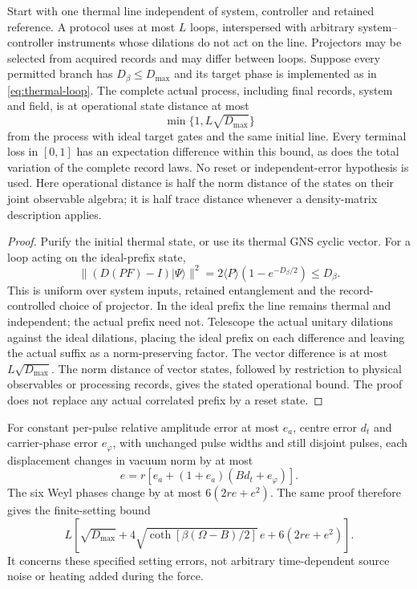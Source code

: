 \begin{proposition}
\label{prop:thermal-reuse}
Start with one thermal line independent of system, controller and retained
reference. A protocol uses at most $L$ loops, interspersed with arbitrary
system--controller instruments whose dilations do not act on the line.
Projectors may be selected from acquired records and may differ between
loops. Suppose every permitted branch has $D_\beta\le D_{\max}$
and its target phase is implemented as in \eqref{eq:thermal-loop}.
The complete actual process, including final records, system and field,
is at operational state distance at most
\[
 \min\{1,L\sqrt{D_{\max}}\}
\]
from the process with ideal target gates and the same initial line.
Every terminal loss in $[0,1]$ has an expectation difference within
this bound, as does the total variation of the complete record laws.
No reset or independent-error hypothesis is used.
Here operational distance is half the norm distance of the states on
their joint observable algebra; it is half trace distance whenever a
density-matrix description applies.
\end{proposition}
\begin{proof}
Purify the initial thermal state, or use its thermal GNS cyclic vector.
For a loop acting on the ideal-prefix state,
\[
 \|(D(PF)-I)|\Psi\rangle\|^2
 =2\langle P\rangle(1-e^{-D_\beta/2})\le D_\beta .
\]
This is uniform over system inputs, retained entanglement and the
record-controlled choice of projector. In the ideal prefix the line
remains thermal and independent; the actual prefix need not.
Telescope the actual unitary dilations against the ideal dilations,
placing the ideal prefix on each difference and leaving the actual
suffix as a norm-preserving factor. The vector difference is at most
$L\sqrt{D_{\max}}$. The norm distance of vector states, followed by
restriction to physical observables or processing records, gives the
stated operational bound.
The proof does not replace any actual correlated prefix by a reset state.
\end{proof}

For constant per-pulse relative amplitude error at most $e_a$, centre
error $d_t$ and carrier-phase error $e_\varphi$, with unchanged pulse
widths and still disjoint pulses, each displacement changes in vacuum
norm by at most
\[
 e=r[e_a+(1+e_a)(Bd_t+e_\varphi)].
\]
The six Weyl phases change by at most $6(2re+e^2)$.
The same proof therefore gives the finite-setting bound
\begin{equation}\label{eq:line-setting}
 L\left[\sqrt{D_{\max}}
 +4\sqrt{\coth[\beta(\Omega-B)/2]}\,e
 +6(2re+e^2)\right].
\end{equation}
It concerns these specified setting errors, not arbitrary time-dependent
source noise or heating added during the force.

